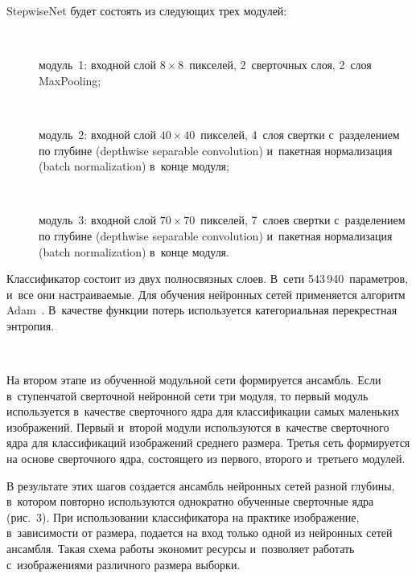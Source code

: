 \begin{multicols}{2}
  
  StepwiseNet будет состоять из сле\-ду\-ющих трех модулей:
  \begin{description}
  \item[\,]  модуль~1: входной слой $8\times8$~пикселей, 2~сверточных слоя, 
2~слоя MaxPooling;
  \item[\,] модуль~2: входной слой $40\times40$~пикселей, 4~слоя свертки 
с~разделением по глубине (depthwise separable convolution) и~пакетная 
нормализация (batch normalization) в~конце модуля;
  \item[\,]  модуль~3: входной слой $70\times70$~пикселей, 7~слоев свертки 
с~разделением по глубине (depthwise separable convolution) и~пакетная 
нормализация (batch normalization) в~конце модуля.
  \end{description}
  
  Классификатор состоит из двух полносвязных слоев. В~сети 
543\,940~параметров, и~все они на\-стра\-и\-ва\-емые. Для обуче\-ния нейронных сетей 
применяется алгоритм Adam~\cite{11-ark}. В~качестве функции потерь 
используется категориальная перекрестная энтропия.
  
  
  \begin{figure*} %
\vspace*{1pt}
\begin{center}
   \mbox{%
\epsfxsize=163mm
}
\end{center}
\vspace*{-9pt}
\vspace*{-6pt}
\end{figure*}

  На втором этапе из обученной модульной сети формируется ансамбль. Если 
в~ступенчатой сверточной нейронной сети три модуля, то первый модуль 
используется в~качестве сверточного ядра для классификации самых маленьких 
изображений. Первый и~второй модули используются в~качестве сверточного 
ядра для классификаций изображений сред\-не\-го размера. \mbox{Третья} сеть 
формируется на основе сверточного ядра, со\-сто\-яще\-го из первого, второго 
и~треть\-его модулей.


  
  В результате этих шагов создается ан\-самбль нейронных сетей разной 
глубины, в~котором повторно используются однократно обученные сверточные   
ядра (рис.~3). При использовании классификатора на практике изображение, 
в~за\-ви\-си\-мости от размера, подается на вход только одной из нейронных сетей ансамбля. Такая схема работы экономит ресурсы и~позволяет работать 
с~изображениями различного размера выборки.


\end{multicols}
